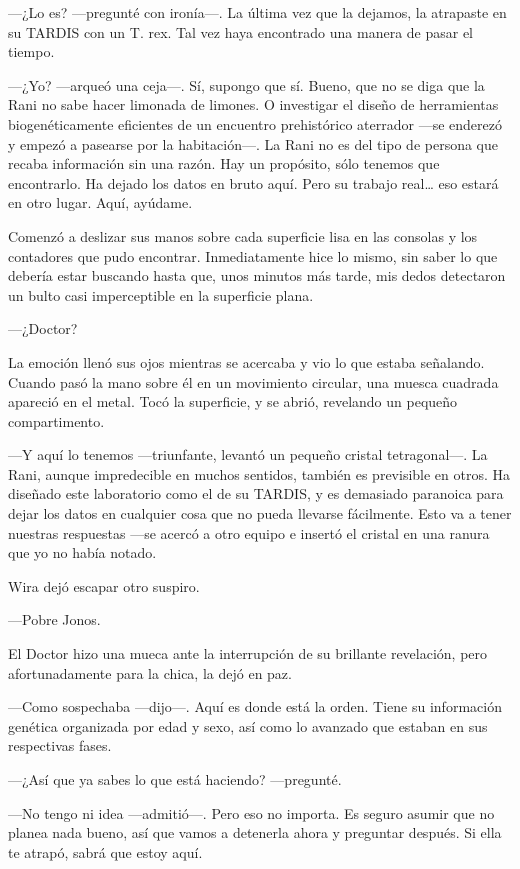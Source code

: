 ---¿Lo es? ---pregunté con ironía---. La última vez que la dejamos, la
atrapaste en su TARDIS con un T. rex. Tal vez haya encontrado una manera
de pasar el tiempo.

---¿Yo? ---arqueó una ceja---. Sí, supongo que sí. Bueno, que no se diga
que la Rani no sabe hacer limonada de limones. O investigar el diseño de
herramientas biogenéticamente eficientes de un encuentro prehistórico
aterrador ---se enderezó y empezó a pasearse por la habitación---. La
Rani no es del tipo de persona que recaba información sin una razón. Hay
un propósito, sólo tenemos que encontrarlo. Ha dejado los datos en bruto
aquí. Pero su trabajo real\ldots{} eso estará en otro lugar. Aquí,
ayúdame.

Comenzó a deslizar sus manos sobre cada superficie lisa en las consolas
y los contadores que pudo encontrar. Inmediatamente hice lo mismo, sin
saber lo que debería estar buscando hasta que, unos minutos más tarde,
mis dedos detectaron un bulto casi imperceptible en la superficie plana.

---¿Doctor?

La emoción llenó sus ojos mientras se acercaba y vio lo que estaba
señalando. Cuando pasó la mano sobre él en un movimiento circular, una
muesca cuadrada apareció en el metal. Tocó la superficie, y se abrió,
revelando un pequeño compartimento.

---Y aquí lo tenemos ---triunfante, levantó un pequeño cristal
tetragonal---. La Rani, aunque impredecible en muchos sentidos, también
es previsible en otros. Ha diseñado este laboratorio como el de su
TARDIS, y es demasiado paranoica para dejar los datos en cualquier cosa
que no pueda llevarse fácilmente. Esto va a tener nuestras respuestas
---se acercó a otro equipo e insertó el cristal en una ranura que yo no
había notado.

Wira dejó escapar otro suspiro.

---Pobre Jonos.

El Doctor hizo una mueca ante la interrupción de su brillante
revelación, pero afortunadamente para la chica, la dejó en paz.

---Como sospechaba ---dijo---. Aquí es donde está la orden. Tiene su
información genética organizada por edad y sexo, así como lo avanzado
que estaban en sus respectivas fases.

---¿Así que ya sabes lo que está haciendo? ---pregunté.

---No tengo ni idea ---admitió---. Pero eso no importa. Es seguro asumir
que no planea nada bueno, así que vamos a detenerla ahora y preguntar
después. Si ella te atrapó, sabrá que estoy aquí.

